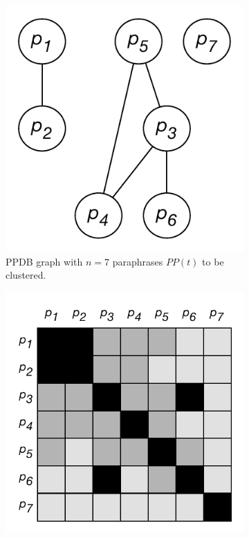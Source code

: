 \documentclass[11pt]{article}
\begin{document}
	\begin{figure}
		\begin{subfigure}[t]{0.25\textwidth}
			\includegraphics[width=\textwidth]{images/pp_graph.pdf}
			\caption{PPDB graph with $n=7$ paraphrases $PP(t)$ to be clustered.}
			\label{fig:ppgraph}
		\end{subfigure}
		\hfill%
		\begin{subfigure}[t]{0.36\textwidth}
			\includegraphics[width=\textwidth]{images/pp_mat_all.pdf}

\end{subfigure}
\end{figure}
\end{document}
